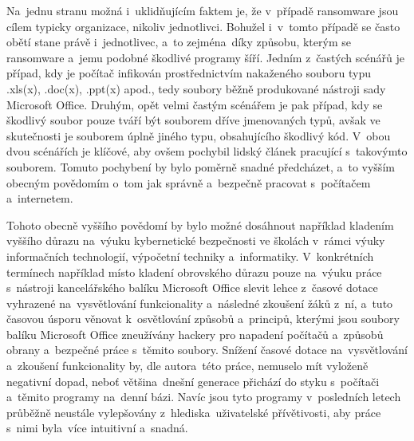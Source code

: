 \documentclass[a4paper, 12pt]{article}
\begin{document}
Na~jednu stranu možná i~uklidňujícím faktem je, že v~případě ransomware jsou cílem typicky organizace, nikoliv jednotlivci. Bohužel i~v~tomto případě se často obětí stane právě i~jednotlivec, a~to zejména~díky způsobu, kterým se ransomware a~jemu podobné škodlivé programy šíří. Jedním z~častých scénářů je případ, kdy je počítač infikován prostřednictvím nakaženého souboru typu .xls(x), .doc(x), .ppt(x) apod., tedy soubory běžně produkované nástroji sady Microsoft Office. Druhým, opět velmi častým scénářem je pak případ, kdy se škodlivý soubor pouze tváří být souborem dříve jmenovaných typů, avšak ve skutečnosti je souborem úplně jiného typu, obsahujícího škodlivý kód. V~obou dvou scénářích je klíčové, aby ovšem pochybil lidský článek pracující s~takovýmto souborem. Tomuto pochybení by bylo poměrně snadné předcházet, a~to vyšším obecným povědomím o~tom jak správně a~bezpečně pracovat s~počítačem a~internetem. 

Tohoto obecně vyššího povědomí by bylo možné dosáhnout například kladením vyššího důrazu na~výuku kybernetické bezpečnosti ve školách v~rámci výuky informačních technologií, výpočetní techniky a~informatiky. V~konkrétních termínech například místo kladení obrovského důrazu pouze na~výuku práce s~nástroji kancelářského balíku Microsoft Office slevit lehce z~časové dotace vyhrazené na~vysvětlování funkcionality a~následné zkoušení žáků z~ní, a~tuto časovou úsporu věnovat k~osvětlování způsobů a~principů, kterými jsou soubory balíku Microsoft Office zneužívány hackery pro napadení počítačů a~způsobů obrany a~bezpečné práce s~těmito soubory. Snížení časové dotace na~vysvětlování a~zkoušení funkcionality by, dle autora~této práce, nemuselo mít vyloženě negativní dopad, neboť většina~dnešní generace přichází do styku s~počítači a~těmito programy na~denní bázi. Navíc jsou tyto programy v~posledních letech průběžně neustále vylepšovány z~hlediska~uživatelské přívětivosti, aby práce s~nimi byla~více intuitivní a~snadná. 
\end{document}

